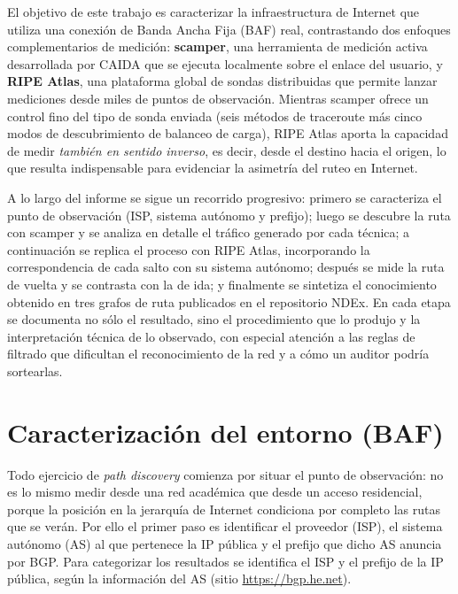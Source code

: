 \documentclass[11pt,a4paper]{article}
\begin{document}
El objetivo de este trabajo es caracterizar la infraestructura de Internet que utiliza una
conexión de Banda Ancha Fija (BAF) real, contrastando dos enfoques complementarios de medición:
\textbf{scamper}, una herramienta de medición activa desarrollada por CAIDA que se ejecuta
localmente sobre el enlace del usuario, y \textbf{RIPE Atlas}, una plataforma global de sondas
distribuidas que permite lanzar mediciones desde miles de puntos de observación. Mientras
scamper ofrece un control fino del tipo de sonda enviada (seis métodos de traceroute más cinco
modos de descubrimiento de balanceo de carga), RIPE Atlas aporta la capacidad de medir
\emph{también en sentido inverso}, es decir, desde el destino hacia el origen, lo que resulta
indispensable para evidenciar la asimetría del ruteo en Internet.

A lo largo del informe se sigue un recorrido progresivo: primero se caracteriza el punto de
observación (ISP, sistema autónomo y prefijo); luego se descubre la ruta con scamper y se
analiza en detalle el tráfico generado por cada técnica; a continuación se replica el proceso
con RIPE Atlas, incorporando la correspondencia de cada salto con su sistema autónomo; después
se mide la ruta de vuelta y se contrasta con la de ida; y finalmente se sintetiza el
conocimiento obtenido en tres grafos de ruta publicados en el repositorio NDEx. En cada etapa se
documenta no sólo el resultado, sino el procedimiento que lo produjo y la interpretación técnica
de lo observado, con especial atención a las reglas de filtrado que dificultan el reconocimiento
de la red y a cómo un auditor podría sortearlas.

\section{Caracterización del entorno (BAF)}
Todo ejercicio de \emph{path discovery} comienza por situar el punto de observación: no es lo
mismo medir desde una red académica que desde un acceso residencial, porque la posición en la
jerarquía de Internet condiciona por completo las rutas que se verán. Por ello el primer paso es
identificar el proveedor (ISP), el sistema autónomo (AS) al que pertenece la IP pública y el
prefijo que dicho AS anuncia por BGP. Para categorizar los resultados se identifica el ISP y el
prefijo de la IP pública, según la información del AS (sitio \url{https://bgp.he.net}).
\end{document}
